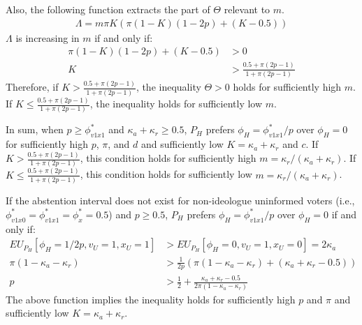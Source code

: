 \par Also, the following function extracts the part of $\Theta$ relevant to $m$. 
\begin{align*}
\Lambda = m \pi K( \pi(1-K)(1-2p)+(K-0.5))
\end{align*}
\noindent $\Lambda$ is increasing in $m$ if and only if: 
\begin{align*}
\pi(1-K)(1-2p)+(K-0.5) &> 0 \\
K &>\frac{0.5 + \pi(2p-1)}{1 + \pi(2p-1)} \tag{Note:$2p-1\geq0$}
\end{align*}
\noindent Therefore, if $K >\frac{0.5 + \pi(2p-1)}{1 + \pi(2p-1)}$, the inequality $\Theta > 0$ holds for sufficiently high $m$. If $K \leq \frac{0.5 + \pi(2p-1)}{1 + \pi(2p-1)}$, the inequality holds for sufficiently low $m$. 

\par In sum, when $p \geq \phi^*_{v1x1}$ and $\kappa_a+\kappa_r \geq 0.5$, $P_H$ prefers $\phi_H=\phi^*_{v1x1}/p$ over $\phi_H=0$ for sufficiently high $p$, $\pi$, and $d$ and sufficiently low $K = \kappa_a + \kappa_r$ and $c$. If $K >\frac{0.5 + \pi(2p-1)}{1 + \pi(2p-1)}$, this condition holds for sufficiently high $m = \kappa_r/(\kappa_a+\kappa_r)$. If $K \leq \frac{0.5 + \pi(2p-1)}{1 + \pi(2p-1)}$, this condition holds for sufficiently low $m = \kappa_r/(\kappa_a+\kappa_r)$.

\par If the abstention interval does not exist for non-ideologue uninformed voters (i.e., $\phi^*_{v1x0}=\phi^*_{v1x1}=\phi^*_x=0.5$) and $p \geq 0.5$, $P_H$ prefers $\phi_H = \phi^*_{v1x1}/p$ over $\phi_H = 0$ if and only if:
\begin{align*}
EU_{P_H}[\phi_H = 1/2p, v_U = 1, x_U = 1] &> EU_{P_H}[\phi_H=0, v_U=1, x_U=0] = 2 \kappa_a \\ 
\pi (1-\kappa_a-\kappa_r) &> \frac{1}{2p} (\pi(1-\kappa_a-\kappa_r) + (\kappa_a + \kappa_r - 0.5)) \\
p &> \frac{1}{2}+ \frac{\kappa_a + \kappa_r - 0.5}{2\pi(1-\kappa_a-\kappa_r)}
\end{align*}
\noindent The above function implies the inequality holds for sufficiently high $p$ and $\pi$ and sufficiently low $K = \kappa_a + \kappa_r$.


